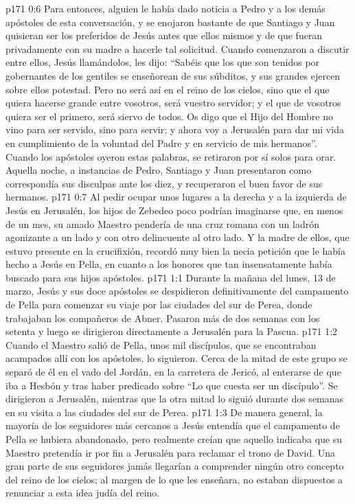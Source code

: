 \vs p171 0:6 Para entonces, alguien le había dado noticia a Pedro y a los demás apóstoles de esta conversación, y se enojaron bastante de que Santiago y Juan quisieran ser los preferidos de Jesús antes que ellos mismos y de que fueran privadamente con su madre a hacerle tal solicitud. Cuando comenzaron a discutir entre ellos, Jesús llamándolos, les dijo: “Sabéis que los que son tenidos por gobernantes de los gentiles se enseñorean de sus súbditos, y sus grandes ejercen sobre ellos potestad. Pero no será así en el reino de los cielos, sino que el que quiera hacerse grande entre vosotros, será vuestro servidor; y el que de vosotros quiera ser el primero, será siervo de todos. Os digo que el Hijo del Hombre no vino para ser servido, sino para servir; y ahora voy a Jerusalén para dar mi vida en cumplimiento de la voluntad del Padre y en servicio de mis hermanos”. Cuando los apóstoles oyeron estas palabras, se retiraron por sí solos para orar. Aquella noche, a instancias de Pedro, Santiago y Juan presentaron como correspondía sus disculpas ante los diez, y recuperaron el buen favor de sus hermanos.
\vs p171 0:7 Al pedir ocupar unos lugares a la derecha y a la izquierda de Jesús en Jerusalén, los hijos de Zebedeo poco podrían imaginarse que, en menos de un mes, su amado Maestro pendería de una cruz romana con un ladrón agonizante a un lado y con otro delincuente al otro lado. Y la madre de ellos, que estuvo presente en la crucifixión, recordó muy bien la necia petición que le había hecho a Jesús en Pella, en cuanto a los honores que tan insensatamente había buscado para sus hijos apóstoles.
\vs p171 1:1 Durante la mañana del lunes, 13 de marzo, Jesús y sus doce apóstoles se despidieron definitivamente del campamento de Pella para comenzar su viaje por las ciudades del sur de Perea, donde trabajaban los compañeros de Abner. Pasaron más de dos semanas con los setenta y luego se dirigieron directamente a Jerusalén para la Pascua.
\vs p171 1:2 Cuando el Maestro salió de Pella, unos mil discípulos, que se encontraban acampados allí con los apóstoles, lo siguieron. Cerca de la mitad de este grupo se separó de él en el vado del Jordán, en la carretera de Jericó, al enterarse de que iba a Hesbón y tras haber predicado sobre “Lo que cuesta ser un discípulo”. Se dirigieron a Jerusalén, mientras que la otra mitad lo siguió durante dos semanas en su visita a las ciudades del sur de Perea.
\vs p171 1:3 De manera general, la mayoría de los seguidores más cercanos a Jesús entendía que el campamento de Pella se hubiera abandonado, pero realmente creían que aquello indicaba que su Maestro pretendía ir por fin a Jerusalén para reclamar el trono de David. Una gran parte de sus seguidores jamás llegarían a comprender ningún otro concepto del reino de los cielos; al margen de lo que les enseñara, no estaban dispuestos a renunciar a esta idea judía del reino.
